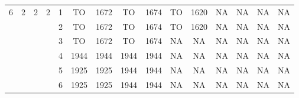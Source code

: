 \begin{longtable}{|c|c|c|c|c|c c|c c|c c|c c|c c|}
\hline
\multirow{6}{*}{6} & \multirow{6}{*}{2} & \multirow{6}{*}{2} & \multirow{6}{*}{2} & 1 & TO & 1672 & TO & 1674 & TO & 1620 & NA & NA & NA & NA \\
 & & & & 2 & TO & 1672 & TO & 1674 & TO & 1620 & NA & NA & NA & NA \\
 & & & & 3 & TO & 1672 & TO & 1674 & NA & NA & NA & NA & NA & NA \\
 & & & & 4 & 1944 & 1944 & 1944 & 1944 & NA & NA & NA & NA & NA & NA \\
 & & & & 5 & 1925 & 1925 & 1944 & 1944 & NA & NA & NA & NA & NA & NA \\
 & & & & 6 & 1925 & 1925 & 1944 & 1944 & NA & NA & NA & NA & NA & NA \\
\hline
\end{longtable}